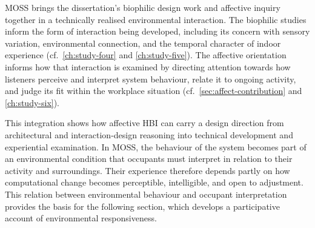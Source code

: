 MOSS brings the dissertation's biophilic design work and affective inquiry together in a technically realised environmental interaction. The biophilic studies inform the form of interaction being developed, including its concern with sensory variation, environmental connection, and the temporal character of indoor experience (cf.~\autoref{ch:study-four} and \autoref{ch:study-five}). The affective orientation informs how that interaction is examined by directing attention towards how listeners perceive and interpret system behaviour, relate it to ongoing activity, and judge its fit within the workplace situation (cf.~\autoref{sec:affect-contribution} and \autoref{ch:study-six}).

This integration shows how affective HBI can carry a design direction from architectural and interaction-design reasoning into technical development and experiential examination. In MOSS, the behaviour of the system becomes part of an environmental condition that occupants must interpret in relation to their activity and surroundings. Their experience therefore depends partly on how computational change becomes perceptible, intelligible, and open to adjustment. This relation between environmental behaviour and occupant interpretation provides the basis for the following section, which develops a participative account of environmental responsiveness.





